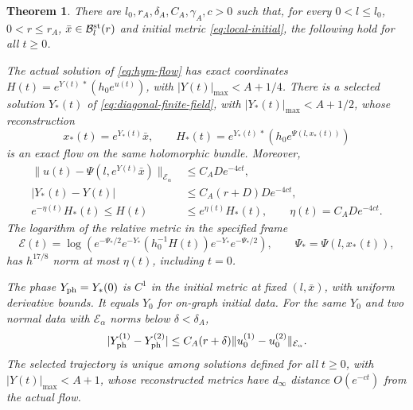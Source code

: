 \documentclass[11pt]{amsart}
\newtheorem{theorem}{Theorem}[section]
\theoremstyle{definition}
\theoremstyle{remark}
\begin{document}
\begin{theorem}\label{thm:local-phase}
There are $l_0,r_A,\delta_A,C_A,\gamma_A,c>0$ such that,
for every $0<l\le l_0$, $0<r\le r_A$,
$\bar x\in\mathcal B_l^{\rm st}(r)$ and initial metric
\eqref{eq:local-initial}, the following hold for all $t\ge0$.

The actual solution of \eqref{eq:hym-flow} has exact coordinates
$H(t)=e^{Y(t)\,*}(h_0e^{u(t)})$, with
$|Y(t)|_{\max}<A+1/4$. There is a selected solution $Y_*(t)$
of \eqref{eq:diagonal-finite-field}, with
$|Y_*(t)|_{\max}<A+1/2$, whose reconstruction
\begin{equation}\label{eq:selected-reconstruction}
 x_*(t)=e^{Y_*(t)}\bar x,\qquad
 H_*(t)=e^{Y_*(t)\,*}(h_0e^{\Psi(l,x_*(t))})
\end{equation}
is an exact flow on the same holomorphic bundle. Moreover,
\begin{equation}\label{eq:geometric-phase-bounds}
 \begin{aligned}
 \|u(t)-\Psi(l,e^{Y(t)}\bar x)\|_{\mathcal E_\alpha}
      &\le C_AD e^{-4ct},\\
 |Y_*(t)-Y(t)|&\le C_A(r+D)D e^{-4ct},\\
 e^{-\eta(t)}H_*(t)\le H(t)&\le e^{\eta(t)}H_*(t),
       \qquad \eta(t)=C_AD e^{-4ct}.
 \end{aligned}
\end{equation}
The logarithm of the relative metric in the specified frame
\begin{equation}\label{eq:relative-matrix}
 \mathcal E(t)=\log\!\left(
 e^{-\Psi_*/2}e^{-Y_*}(h_0^{-1}H(t))
                e^{-Y_*}e^{-\Psi_*/2}\right),
 \qquad \Psi_*=\Psi(l,x_*(t)),
\end{equation}
has $h^{17/8}$ norm at most $\eta(t)$, including $t=0$.

The phase $Y_{\rm ph}=Y_*(0)$ is $C^1$ in the initial metric at
fixed $(l,\bar x)$, with uniform derivative bounds. It equals
$Y_0$ for on-graph initial data. For the same $Y_0$ and two
normal data with $\mathcal E_\alpha$ norms below $\delta<\delta_A$,
\begin{equation}\label{eq:phase-normal-lipschitz}
 |Y_{\rm ph}^{(1)}-Y_{\rm ph}^{(2)}|
 \le C_A(r+\delta)\|u_0^{(1)}-u_0^{(2)}\|_{\mathcal E_\alpha}.
\end{equation}
The selected trajectory is unique among solutions defined for all
$t\ge0$, with $|Y(t)|_{\max}<A+1$, whose reconstructed metrics
have $d_\infty$ distance $O(e^{-ct})$ from the actual flow.


\end{theorem}
\end{document}
